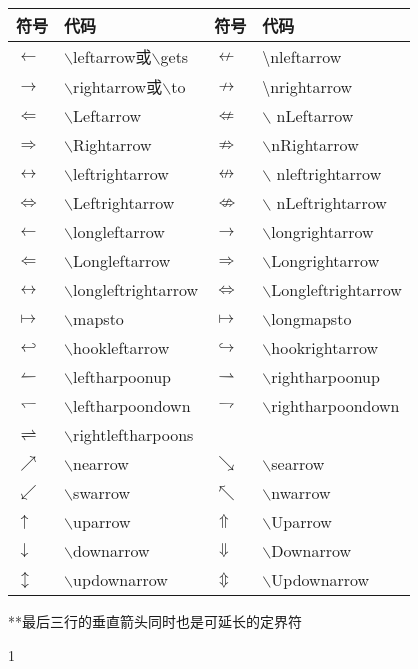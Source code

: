 \documentclass[UTF8,fontset=ubuntu]{ctexart}
\begin{document}
\begin{threeparttable}
\begin{tabular}{l l l l}
	\hline
	符号 & 代码 & 符号 & 代码\\
	\hline
	$\gets$ & $\backslash$leftarrow或$\backslash$gets & $\nleftarrow$ & \textbackslash nleftarrow\tnote{1}\\
	$\to$ & $\backslash$rightarrow或$\backslash$to & $\nrightarrow$ & \textbackslash nrightarrow\tnote{1}\\
	$\Leftarrow$ & $\backslash$Leftarrow & $\nLeftarrow$ & $\backslash$ nLeftarrow\tnote{1}\\
	$\Rightarrow$ & $\backslash$Rightarrow & $\nRightarrow$ & $\backslash$nRightarrow\\
	$\leftrightarrow$ & $\backslash$leftrightarrow & $\nleftrightarrow$ & $\backslash$ nleftrightarrow\tnote{1}\\
	$\Leftrightarrow$ & $\backslash$Leftrightarrow & $\nLeftrightarrow$ & $\backslash$ nLeftrightarrow\tnote{1}\\
	$\longleftarrow$ & $\backslash$longleftarrow & $\longrightarrow$ & $\backslash$longrightarrow\\
	$\Longleftarrow$ & $\backslash$Longleftarrow & $\Longrightarrow$ & $\backslash$Longrightarrow\\
	$\longleftrightarrow$ & $\backslash$longleftrightarrow & $\Longleftrightarrow$ & $\backslash$Longleftrightarrow\\
	$\mapsto$ & $\backslash$mapsto & $\longmapsto$ & $\backslash$longmapsto\\
	$\hookleftarrow$ & $\backslash$hookleftarrow & $\hookrightarrow$ & $\backslash$hookrightarrow\\
	$\leftharpoonup$ & $\backslash$leftharpoonup & $\rightharpoonup$ & $\backslash$rightharpoonup\\
	$\leftharpoondown$ & $\backslash$leftharpoondown & $\rightharpoondown$ & $\backslash$rightharpoondown\\
	$\rightleftharpoons$ & $\backslash$rightleftharpoons\\
	$\nearrow$ & $\backslash$nearrow & $\searrow$ & $\backslash$searrow\\
	$\swarrow$ & $\backslash$swarrow & $\nwarrow$ & $\backslash$nwarrow\\
	$\uparrow$ & $\backslash$uparrow & $\Uparrow$ & $\backslash$Uparrow\\
	$\downarrow$ & $\backslash$downarrow & $\Downarrow$ & $\backslash$Downarrow\\
	$\updownarrow$ & $\backslash$updownarrow & $\Updownarrow$ & $\backslash$Updownarrow\\
	\hline
\end{tabular}
**最后三行的垂直箭头同时也是可延长的定界符
\begin{tablenotes}
	\item[1] 
\end{tablenotes}
\caption{\LaTeX 箭头符号}
\end{threeparttable}
\end{document}
